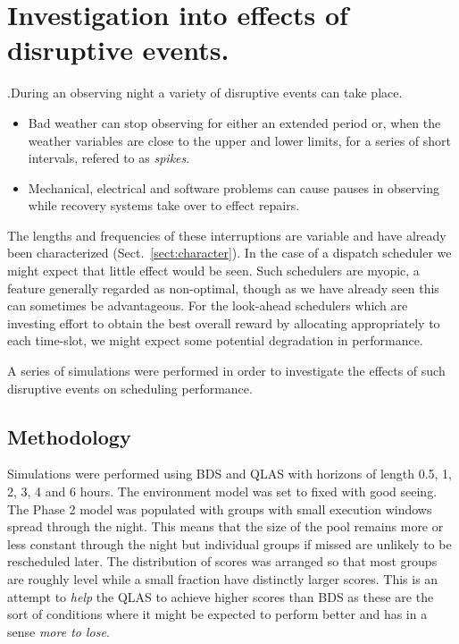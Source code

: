\section{Investigation into effects of disruptive events.}
\label{sect:exp_disruption}

.During an observing night a variety of disruptive events can take place. 
\begin{itemize}
\item Bad weather can stop observing for either an extended period or, when the weather variables are close to the upper and lower limits, for a series of short intervals, refered to as \emph{spikes}.
\item Mechanical, electrical and software problems can cause pauses in observing while recovery systems take over to effect repairs.
\end{itemize}

The lengths and frequencies of these interruptions are variable and have already been characterized (Sect.~\ref{sect:character}). In the case of a dispatch scheduler we might expect that little effect would be seen. Such schedulers are myopic, a feature generally regarded as non-optimal, though as we have already seen this can sometimes be advantageous. For the look-ahead schedulers which are investing effort to obtain the best overall reward by allocating appropriately to each time-slot, we might expect some potential degradation in performance.

A series of simulations were performed in order to investigate the effects of such disruptive events on scheduling performance.

\subsection{Methodology}
Simulations were performed using BDS and QLAS with horizons of length 0.5, 1, 2, 3, 4 and 6 hours. The environment model was set to fixed with good seeing. The Phase 2 model was populated with groups with small execution windows spread through the night. This means that the size of the pool remains more or less constant through the night but individual groups if missed are unlikely to be rescheduled later. The distribution of scores was arranged so that most groups are roughly level while a small fraction have distinctly larger scores. This is an attempt to \emph{help} the QLAS to achieve higher scores than BDS as these are the sort of conditions where it might be expected to perform better and has in a sense \emph{more to lose}.


